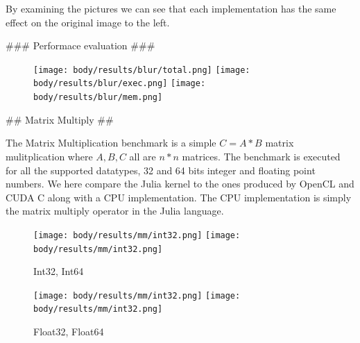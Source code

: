 \begin{markdown}
By examining the pictures we can see that each implementation has the
same effect on the original image to the left.

### Performace evaluation ###

\begin{figure}[H]
  \begin{center}
  \texttt{[image: body/results/blur/total.png]}
  \texttt{[image: body/results/blur/exec.png]}
  \texttt{[image: body/results/blur/mem.png]}
    \caption{}
    \label{fig:res:blur}
  \end{center}
\end{figure}

## Matrix Multiply ##

The Matrix Multiplication benchmark is a simple $C = A * B$ matrix
mulitplication where $A, B, C$ all are $n*n$ matrices. The benchmark
is executed for all the supported datatypes, 32 and 64 bits integer
and floating point numbers. We here compare the Julia kernel to the
ones produced by OpenCL and CUDA C along with a CPU implementation.
The CPU implementation is simply the matrix multiply operator in the
Julia language.

\begin{figure}[H]
  \centering
  \texttt{[image: body/results/mm/int32.png]}
  \texttt{[image: body/results/mm/int32.png]}
  \caption{Int32, Int64}
  \label{fig:res:mm}
\end{figure}

\begin{figure}[H]
  \centering
  \texttt{[image: body/results/mm/int32.png]}
  \texttt{[image: body/results/mm/int32.png]}
  \caption{Float32, Float64}
  \label{fig:res:mm}
\end{figure}


\end{markdown}

